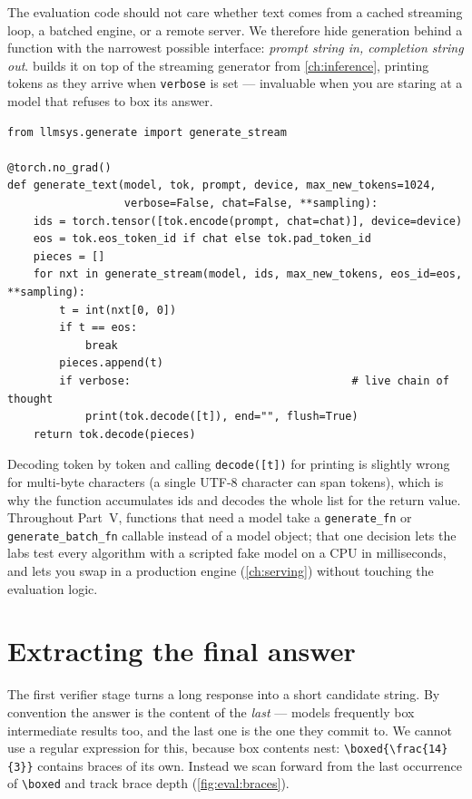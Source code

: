 The evaluation code should not care whether text comes from a cached streaming loop, a batched
engine, or a remote server. We therefore hide generation behind a function with the narrowest
possible interface: \emph{prompt string in, completion string out}.  builds
it on top of the streaming generator from \cref{ch:inference}, printing tokens as they arrive when
\texttt{verbose} is set --- invaluable when you are staring at a model that refuses to box its
answer.

\begin{lstlisting}[caption={Prompt-in, text-out wrapper over the cached streaming generator.},label={lst:eval:wrapper}]
from llmsys.generate import generate_stream

@torch.no_grad()
def generate_text(model, tok, prompt, device, max_new_tokens=1024,
                  verbose=False, chat=False, **sampling):
    ids = torch.tensor([tok.encode(prompt, chat=chat)], device=device)
    eos = tok.eos_token_id if chat else tok.pad_token_id
    pieces = []
    for nxt in generate_stream(model, ids, max_new_tokens, eos_id=eos, **sampling):
        t = int(nxt[0, 0])
        if t == eos:
            break
        pieces.append(t)
        if verbose:                                  # live chain of thought
            print(tok.decode([t]), end="", flush=True)
    return tok.decode(pieces)
\end{lstlisting}

Decoding token by token and calling \texttt{decode([t])} for printing is slightly wrong for
multi-byte characters (a single UTF-8 character can span tokens), which is why the function
accumulates ids and decodes the whole list for the return value. Throughout Part~V, functions
that need a model take a \texttt{generate\_fn} or \texttt{generate\_batch\_fn} callable instead
of a model object; that one decision lets the labs test every algorithm with a scripted fake
model on a CPU in milliseconds, and lets you swap in a production engine (\cref{ch:serving})
without touching the evaluation logic.

\section{Extracting the final answer}\label{sec:eval:extract}

The first verifier stage turns a long response into a short candidate string. By convention the
answer is the content of the \emph{last} \bx{} --- models frequently box intermediate results
too, and the last one is the one they commit to. We cannot use a regular expression for this,
because box contents nest: \texttt{\textbackslash boxed\{\textbackslash frac\{14\}\{3\}\}}
contains braces of its own. Instead we scan forward from the last occurrence of
\texttt{\textbackslash boxed} and track brace depth (\cref{fig:eval:braces}).

